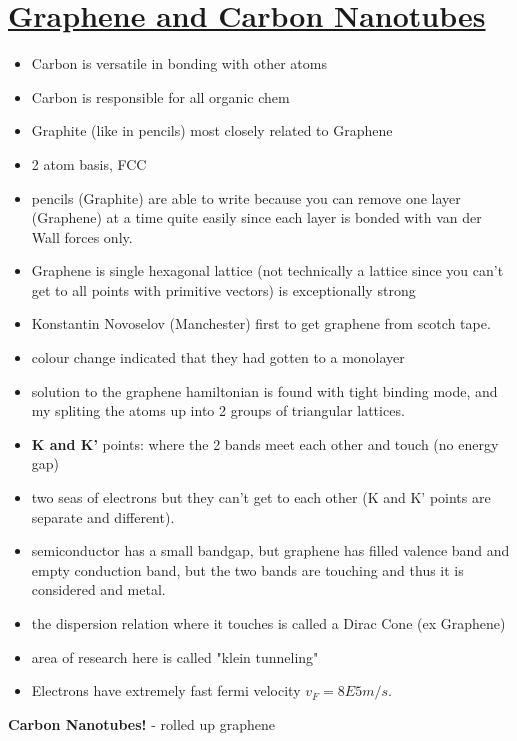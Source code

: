 \section[Graphene and Carbon Nanotubes]{\hyperlink{toc}{Graphene and Carbon Nanotubes}}

 
 \begin{itemize}
     \item Carbon is versatile in bonding with other atoms
     \item Carbon is responsible for all organic chem
     \item Graphite (like in pencils) most closely related to Graphene
     \item 2 atom basis, FCC
     \item pencils (Graphite) are able to write because you can remove one layer (Graphene) at a time quite easily since each layer is bonded with van der Wall forces only.
     \item Graphene is single hexagonal lattice (not technically a lattice since you can't get to all points with primitive vectors) is exceptionally strong
     \item Konstantin Novoselov (Manchester) first to get graphene from scotch tape.
     \item colour change indicated that they had gotten to a monolayer
     \item solution to the graphene hamiltonian is found with tight binding mode, and my spliting the atoms up into 2 groups of triangular lattices. 
     \item \textbf{K and K'} points: where the 2 bands meet each other and touch (no energy gap)
     \item two seas of electrons but they can't get to each other (K and K' points are separate and different).
     \item semiconductor has a small bandgap, but graphene has filled valence band and empty conduction band, but the two bands are touching and thus it is considered and metal.
     \item the dispersion relation where it touches is called a Dirac Cone (ex Graphene)
     \item area of research here is called "klein tunneling"
     \item Electrons have extremely fast fermi velocity $v_F = 8E5 m/s$.
 \end{itemize}
 
 \textbf{Carbon Nanotubes!} - rolled up graphene
 

